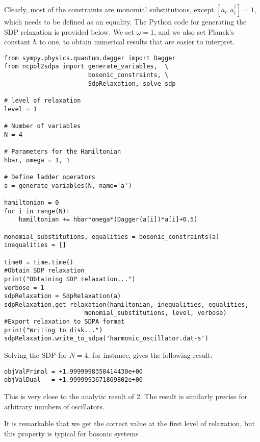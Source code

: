 \documentclass{article}
\begin{document}
Clearly, most of the constraints are monomial substitutions, except $[a_{i},a_{i}^{\dagger}]=1$, which needs to be defined as an equality. The Python code for generating the SDP relaxation is provided below. We set $\omega=1$, and we also set Planck's constant $\hbar$ to one, to obtain numerical results that are easier to interpret.
\begin{verbatim}
from sympy.physics.quantum.dagger import Dagger
from ncpol2sdpa import generate_variables,  \
                       bosonic_constraints, \
                       SdpRelaxation, solve_sdp

# level of relaxation
level = 1

# Number of variables
N = 4

# Parameters for the Hamiltonian
hbar, omega = 1, 1

# Define ladder operators
a = generate_variables(N, name='a')

hamiltonian = 0
for i in range(N):
    hamiltonian += hbar*omega*(Dagger(a[i])*a[i]+0.5)

monomial_substitutions, equalities = bosonic_constraints(a)
inequalities = []

time0 = time.time()
#Obtain SDP relaxation
print("Obtaining SDP relaxation...")
verbose = 1
sdpRelaxation = SdpRelaxation(a)
sdpRelaxation.get_relaxation(hamiltonian, inequalities, equalities, 
                      monomial_substitutions, level, verbose)
#Export relaxation to SDPA format
print("Writing to disk...")
sdpRelaxation.write_to_sdpa('harmonic_oscillator.dat-s')                      
\end{verbatim}

Solving the SDP for $N=4$, for instance, gives the following result:
\begin{verbatim}
objValPrimal = +1.9999998358414430e+00
objValDual   = +1.9999993671869802e+00
\end{verbatim}
This is very close to the analytic result of 2. The result is similarly precise for arbitrary numbers of oscillators. 

It is remarkable that we get the correct value at the first level of relaxation, but this property is typical for bosonic systems~\citep{navascues2013paradox}.
\end{document}
